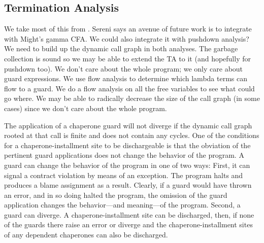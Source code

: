 \documentclass{sigplanconf}
\begin{document}
\subsection{Termination Analysis}

We take most of this from \cite{sereni2007termination}.
Sereni says an avenue of future work is to integrate with Might's gamma CFA.
We could also integrate it with pushdown analysis?
We need to build up the dynamic call graph in both analyses.
The garbage collection is sound so we may be able to extend the TA to it (and hopefully for pushdown too).
We don't care about the whole program; we only care about guard expressions.
We use flow analysis to determine which lambda terms can flow to a guard.
We do a flow analysis on all the free variables to see what could go where.
We may be able to radically decrease the size of the call graph (in some cases) since we don't care about the whole program.

The application of a chaperone guard will not diverge if the dynamic call graph rooted at that call is finite and does not contain any cycles.
One of the conditions for a chaperone-installment site to be dischargeable is that the obviation of the pertinent guard applications does not change the behavior of the program.
A guard can change the behavior of the program in one of two ways:
First, it can signal a contract violation by means of an exception.
The program halts and produces a blame assignment as a result.
Clearly, if a guard would have thrown an error, and in so doing halted the program, the omission of the guard application changes the behavior---and meaning---of the program.
Second, a guard can diverge.
A chaperone-installment site can be discharged, then, if none of the guards there raise an error or diverge and the chaperone-installment sites of any dependent chaperones can also be discharged.
\end{document}
